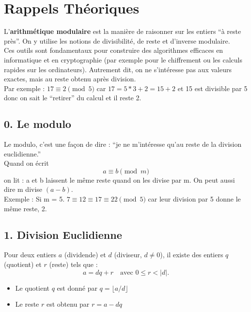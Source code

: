 
\section*{Rappels Théoriques}

L’\textbf{arithmétique modulaire} est la manière de raisonner sur les entiers “à reste près”. On y utilise les notions de divisibilité, de reste et d’inverse modulaire. \\

Ces outils sont fondamentaux pour construire des algorithmes efficaces en informatique et en cryptographie (par exemple pour le chiffrement ou les calculs rapides sur les ordinateurs). Autrement dit, on ne s’intéresse pas aux valeurs exactes, mais au reste obtenu après division. \\

Par exemple :
$17 \equiv 2 \pmod 5$ car $17 = 5 * 3 + 2 = 15 + 2$ et 15 est divisible par 5 donc on sait le “retirer” du calcul et il reste 2.

\subsection*{0. Le modulo}
Le modulo, c’est une façon de dire : “je ne m’intéresse qu’au reste de la division euclidienne.” \\

Quand on écrit
\[
a \equiv b \pmod{m}
\]
on lit : a et b laissent le même reste quand on les divise par m. On peut aussi dire m divise $(a-b)$. \\

Exemple : Si m = 5. $7 \equiv 12 \equiv 17 \equiv 22 \pmod{5}$ car leur division par 5 donne le même reste, 2.

\subsection*{1. Division Euclidienne}
Pour deux entiers \( a \) (dividende) et \( d \) (diviseur, \( d \neq 0 \)), 
il existe des entiers \( q \) (quotient) et \( r \) (reste) tels que :
\[
a = dq + r \quad \text{avec } 0 \le r < |d|.
\]
\begin{itemize}
    \item Le quotient \( q \) est donné par \( q = \lfloor a / d \rfloor \)
    \item Le reste \( r \) est obtenu par \( r = a - dq \)
\end{itemize}

